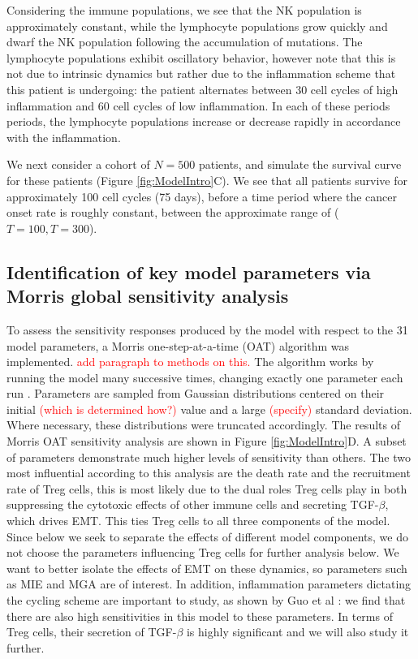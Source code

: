 \documentclass[11pt, a4paper, preprint]{article}
\newcommand{\tcr} { \textcolor{red} }
\begin{document}
Considering the immune populations, we see that the NK population is approximately constant, while the lymphocyte populations grow quickly and dwarf the NK population following the accumulation of mutations.
The lymphocyte populations exhibit oscillatory behavior, however note that this is not due to intrinsic dynamics but rather due to the inflammation scheme that this patient is undergoing: 
the patient alternates between 30 cell cycles of high inflammation and 60 cell cycles of low inflammation.
In each of these periods periods, the lymphocyte populations increase or decrease rapidly in accordance with the inflammation.

We next consider a cohort of $N=500$ patients, and simulate the survival curve for these patients (Figure \ref{fig:ModelIntro}C). We see that all patients survive for approximately 100 cell cycles (75 days), before a time period where the cancer onset rate is roughly constant, between the approximate range of ($T = 100, T = 300$).


\subsection{Identification of key model parameters via Morris global sensitivity analysis}\label{SensAnalysis}
To assess the sensitivity responses produced by the model with respect to the 31 model parameters, a Morris one-step-at-a-time (OAT) algorithm was implemented. \tcr{add paragraph to methods on this.}
The algorithm works by running the model many successive times, changing exactly one parameter each run \cite{morris1991factorial, sohier2014improvement}. Parameters are sampled from Gaussian distributions centered on their initial \tcr{(which is determined how?)} value and a large \tcr{(specify)} standard deviation. Where necessary, these distributions were truncated accordingly.
The results of Morris OAT sensitivity analysis are shown in Figure \ref{fig:ModelIntro}D. A subset of parameters demonstrate much higher levels of sensitivity than others.
The two most influential according to this analysis are the death rate and the recruitment rate of Treg cells, this is most likely due to the dual roles Treg cells play in both suppressing the cytotoxic effects of other immune cells and secreting TGF-$\beta$, which drives EMT. This ties Treg cells to all three components of the model. Since below we seek to separate the effects of different model components, we do not choose the parameters influencing Treg cells for further analysis below. 
We want to better isolate the effects of EMT on these dynamics, so parameters such as MIE and MGA are of interest.
In addition, inflammation parameters dictating the cycling scheme are important to study, as shown by Guo et al \cite{}: we find that there are also high sensitivities in this model to these parameters.
In terms of Treg cells, their secretion of TGF-$\beta$ is highly significant and we will also study it further.
\end{document}
